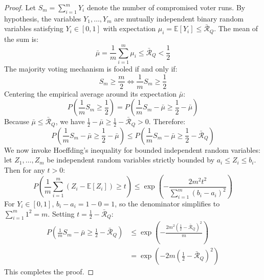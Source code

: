 \begin{proof}
Let $S_m = \sum_{i=1}^m Y_i$ denote the number of compromised voter runs. By hypothesis, the variables $Y_1, \dots, Y_m$ are mutually independent binary random variables satisfying $Y_i \in [0, 1]$ with expectation $\mu_i = \mathbb{E}[Y_i] \le \bar{\mathcal{R}}_Q$.
The mean of the sum is:
\begin{equation}
    \bar{\mu} = \frac{1}{m}\sum_{i=1}^m \mu_i \le \bar{\mathcal{R}}_Q < \frac{1}{2}
\end{equation}
The majority voting mechanism is fooled if and only if:
\begin{equation}
    S_m \ge \frac{m}{2} \iff \frac{1}{m}S_m \ge \frac{1}{2}
\end{equation}
Centering the empirical average around its expectation $\bar{\mu}$:
\begin{equation}
    P\left(\frac{1}{m}S_m \ge \frac{1}{2}\right) = P\left( \frac{1}{m}S_m - \bar{\mu} \ge \frac{1}{2} - \bar{\mu} \right)
\end{equation}
Because $\bar{\mu} \le \bar{\mathcal{R}}_Q$, we have $\frac{1}{2} - \bar{\mu} \ge \frac{1}{2} - \bar{\mathcal{R}}_Q > 0$. Therefore:
\begin{equation}
    P\left( \frac{1}{m}S_m - \bar{\mu} \ge \frac{1}{2} - \bar{\mu} \right) \le P\left( \frac{1}{m}S_m - \bar{\mu} \ge \frac{1}{2} - \bar{\mathcal{R}}_Q \right)
\end{equation}
We now invoke Hoeffding's inequality for bounded independent random variables: let $Z_1, \dots, Z_m$ be independent random variables strictly bounded by $a_i \le Z_i \le b_i$. Then for any $t > 0$:
\begin{equation}
    P\left( \frac{1}{m}\sum_{i=1}^m (Z_i - \mathbb{E}[Z_i]) \ge t \right) \le \exp\left( -\frac{2 m^2 t^2}{\sum_{i=1}^m (b_i - a_i)^2} \right)
\end{equation}
For $Y_i \in [0, 1]$, $b_i - a_i = 1 - 0 = 1$, so the denominator simplifies to $\sum_{i=1}^m 1^2 = m$. Setting $t = \frac{1}{2} - \bar{\mathcal{R}}_Q$:
\begin{align}
    P\left( \frac{1}{m}S_m - \bar{\mu} \ge \frac{1}{2} - \bar{\mathcal{R}}_Q \right) &\le \exp\left( -\frac{2 m^2 \left(\frac{1}{2} - \bar{\mathcal{R}}_Q\right)^{\!2}}{m} \right) \\
    &= \exp\left( -2 m \left(\frac{1}{2} - \bar{\mathcal{R}}_Q\right)^{\!2} \right)
\end{align}
This completes the proof.
\end{proof}

